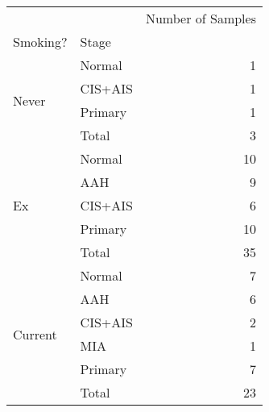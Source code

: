 \begin{tabular}{l|lr}
\toprule
        &       & Number of Samples \\
Smoking? & Stage &                   \\
\midrule
\multirow{4}{*}{Never} & Normal &                 1 \\
        & CIS+AIS &                 1 \\
        & Primary &                 1 \\
        & Total &                 3 \\
\cline{1-3}
\multirow{5}{*}{Ex} & Normal &                10 \\
        & AAH &                 9 \\
        & CIS+AIS &                 6 \\
        & Primary &                10 \\
        & Total &                35 \\
\cline{1-3}
\multirow{6}{*}{Current} & Normal &                 7 \\
        & AAH &                 6 \\
        & CIS+AIS &                 2 \\
        & MIA &                 1 \\
        & Primary &                 7 \\
        & Total &                23 \\
\bottomrule
\end{tabular}
